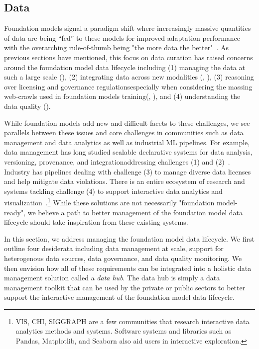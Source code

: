 \newsection
\subsection{Data}
\label{sec:data}

Foundation models signal a paradigm shift where increasingly massive quantities of data are being ``fed'' to these models for improved adaptation performance~\citep{devlin2019bert,radford2021learning,tolstikhin2021mlpmixer} with the overarching rule-of-thumb being "the more data the better"~\citep{kaplan2020}. As previous sections have mentioned, this focus on data curation has raised concerns around the foundation model data lifecycle including (1) managing the data at such a large scale (), (2) integrating data across new modalities (, ), (3) reasoning over licensing and governance regulations\dash{}especially when considering the massing web-crawls used in foundation models training\dash{}(, ), and (4) understanding the data quality ().

While foundation models add new and difficult facets to these challenges, we see parallels between these issues and core challenges in communities such as data management and data analytics as well as industrial ML pipelines. For example, data management has long studied scalable declarative systems for data analysis, versioning, provenance, and integration\textemdash addressing challenges (1) and (2)~\citep{zaharia2012resilient, cudre2009demonstration, stonebraker2013voltdb, Stonebraker2018dataintegration, hellerstein2005readings}. Industry has pipelines dealing with challenge (3) to manage diverse data licenses and help mitigate data violations. There is an entire ecosystem of research and systems tackling challenge (4) to support interactive data analytics and visualization~\citep{hohman2020understanding}.\footnote{VIS, CHI, SIGGRAPH are a few communities that research interactive data analytics methods and systems. Software systems and libraries such as Pandas, Matplotlib, and Seaborn also aid users in interactive exploration.} While these solutions are not necessarily "foundation model-ready", we believe a path to better management of the foundation model data lifecycle should take inspiration from these existing systems.

In this section, we address managing the foundation model data lifecycle. We first outline four desiderata including data management at scale, support for heterogenous data sources, data governance, and data quality monitoring. We then envision how all of these requirements can be integrated into a holistic data management solution called a {\em data hub}. The data hub is simply a data management toolkit that can be used by the private or public sectors to better support the interactive management of the foundation model data lifecycle.

